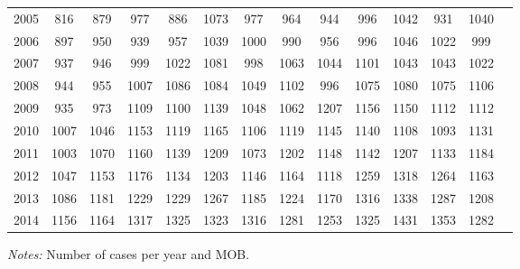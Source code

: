 \begin{table}[H]
\begin{threeparttable}
{\begin{tabular}{l*{13}{c}}
2005        &         816&         879&         977&         886&        1073&         977&         964&         944&         996&        1042&         931&        1040\\
2006        &         897&         950&         939&         957&        1039&        1000&         990&         956&         996&        1046&        1022&         999\\
2007        &         937&         946&         999&        1022&        1081&         998&        1063&        1044&        1101&        1043&        1043&        1022\\
2008        &         944&         955&        1007&        1086&        1084&        1049&        1102&         996&        1075&        1080&        1075&        1106\\
2009        &         935&         973&        1109&        1100&        1139&        1048&        1062&        1207&        1156&        1150&        1112&        1112\\
2010        &        1007&        1046&        1153&        1119&        1165&        1106&        1119&        1145&        1140&        1108&        1093&        1131\\
2011        &        1003&        1070&        1160&        1139&        1209&        1073&        1202&        1148&        1142&        1207&        1133&        1184\\
2012        &        1047&        1153&        1176&        1134&        1203&        1146&        1164&        1118&        1259&        1318&        1264&        1163\\
2013        &        1086&        1181&        1229&        1229&        1267&        1185&        1224&        1170&        1316&        1338&        1287&        1208\\
2014        &        1156&        1164&        1317&        1325&        1323&        1316&        1281&        1253&        1325&        1431&        1353&        1282\\
 \bottomrule \end{tabular} } \begin{tablenotes} \item \scriptsize \emph{Notes:} Number of cases per year and MOB. \end{tablenotes} \end{threeparttable} \end{table} 
